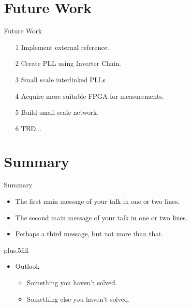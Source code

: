 \documentclass{beamer}
\begin{document}
\section*{Future Work}

\begin{frame}{Future Work}
    \begin{itemize}
        \item[1]
            Implement external reference.
        \item[2]
        	Create PLL using Inverter Chain.
        \item[3]
            Small scale interlinked PLLs
        \item[4]
            Acquire more suitable FPGA for measurements.
        \item[5]
            Build small scale network.
        \item[6]
            TBD...
    \end{itemize}
 
\end{frame}

\section*{Summary}

\begin{frame}{Summary}

  \begin{itemize}
  \item
    The \alert{first main message} of your talk in one or two lines.
  \item
    The \alert{second main message} of your talk in one or two lines.
  \item
    Perhaps a \alert{third message}, but not more than that.
  \end{itemize}

  \vskip0pt plus.5fill
  \begin{itemize}
  \item
    Outlook
    \begin{itemize}
    \item
      Something you haven't solved.
    \item
      Something else you haven't solved.
    \end{itemize}
  \end{itemize}
\end{frame}
\end{document}
